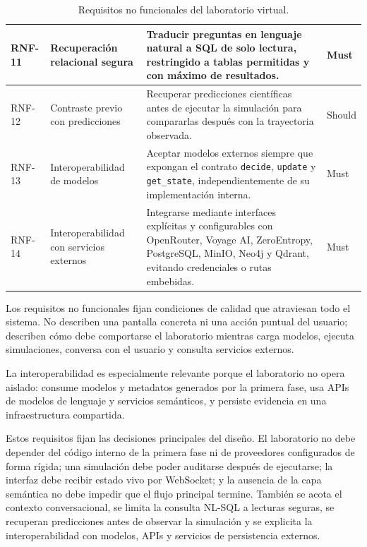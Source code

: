 \begin{table}[H]
\begin{center}
\begin{tabular}{|>{\raggedright\arraybackslash}p{1.15cm}|>{\raggedright\arraybackslash}p{2.35cm}|>{\raggedright\arraybackslash}p{6.25cm}|>{\raggedright\arraybackslash}p{0.95cm}|}
RNF-11 & Recuperación relacional segura & Traducir preguntas en lenguaje natural a SQL de solo lectura, restringido a tablas permitidas y con máximo de resultados. & Must \\ \hline
RNF-12 & Contraste previo con predicciones & Recuperar predicciones científicas antes de ejecutar la simulación para compararlas después con la trayectoria observada. & Should \\ \hline
RNF-13 & Interoperabilidad de modelos & Aceptar modelos externos siempre que expongan el contrato \texttt{decide}, \texttt{update} y \texttt{get\_state}, independientemente de su implementación interna. & Must \\ \hline
RNF-14 & Interoperabilidad con servicios externos & Integrarse mediante interfaces explícitas y configurables con OpenRouter, Voyage AI, ZeroEntropy, PostgreSQL, MinIO, Neo4j y Qdrant, evitando credenciales o rutas embebidas. & Must \\ \hline
\end{tabular}
\caption[Requisitos no funcionales]{Requisitos no funcionales del laboratorio
virtual.}
\label{tab:requisitos-no-funcionales}
\end{center}
\end{table}

Los requisitos no funcionales fijan condiciones de calidad que atraviesan todo
el sistema. No describen una pantalla concreta ni una acción puntual del
usuario; describen cómo debe comportarse el laboratorio mientras carga modelos,
ejecuta simulaciones, conversa con el usuario y consulta servicios externos.

La interoperabilidad es especialmente relevante porque el laboratorio no opera
aislado: consume modelos y metadatos generados por la primera fase, usa APIs de
modelos de lenguaje y servicios semánticos, y persiste evidencia en una
infraestructura compartida.

Estos requisitos fijan las decisiones principales del diseño. El laboratorio
no debe depender del código interno de la primera fase ni de proveedores
configurados de forma rígida; una simulación debe
poder auditarse después de ejecutarse; la interfaz debe recibir estado vivo por
WebSocket; y la ausencia de la capa semántica no debe impedir que el flujo
principal termine. También se acota el contexto conversacional, se limita la
consulta NL-SQL a lecturas seguras, se recuperan predicciones antes de observar
la simulación y se explicita la interoperabilidad con modelos, APIs y servicios
de persistencia externos.
